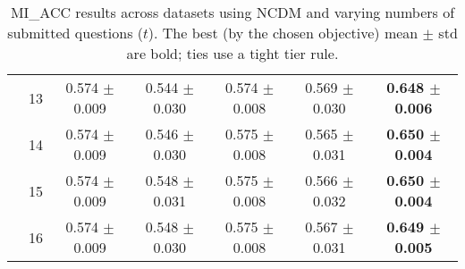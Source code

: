 \begin{table*}[t]
{\begin{tabular}{ll c c c c c}
        & 13 & 0.574 $\pm$ 0.009 & 0.544 $\pm$ 0.030 & 0.574 $\pm$ 0.008 & 0.569 $\pm$ 0.030 & \textbf{0.648 $\pm$ 0.006} \\
        & 14 & 0.574 $\pm$ 0.009 & 0.546 $\pm$ 0.030 & 0.575 $\pm$ 0.008 & 0.565 $\pm$ 0.031 & \textbf{0.650 $\pm$ 0.004} \\
        & 15 & 0.574 $\pm$ 0.009 & 0.548 $\pm$ 0.031 & 0.575 $\pm$ 0.008 & 0.566 $\pm$ 0.032 & \textbf{0.650 $\pm$ 0.004} \\
        & 16 & 0.574 $\pm$ 0.009 & 0.548 $\pm$ 0.030 & 0.575 $\pm$ 0.008 & 0.567 $\pm$ 0.031 & \textbf{0.649 $\pm$ 0.005} \\
\bottomrule
\end{tabular}
}
\caption{MI_ACC results across datasets using NCDM and varying numbers of submitted questions ($t$). The best (by the chosen objective) mean $\pm$ std are bold; ties use a tight tier rule.}
\label{tab:results-mi_acc-ncdm}
\end{table*}
